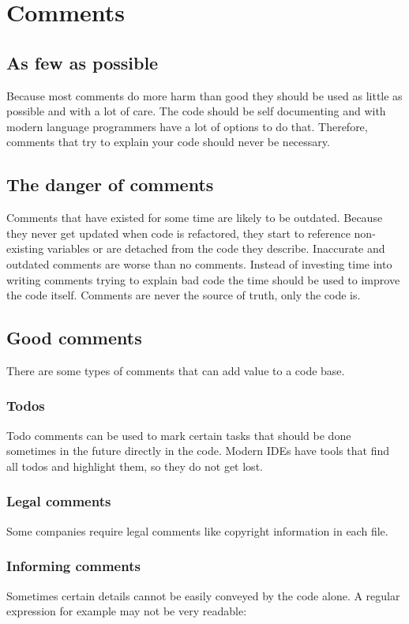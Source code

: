 \section{Comments}

\subsection{As few as possible}
Because most comments do more harm than good they should be used as little as possible and with a lot of care. The code should be self documenting and with modern language programmers have a lot of options to do that. Therefore, comments that try to explain your code should never be necessary.

\subsection{The danger of comments}
Comments that have existed for some time are likely to be outdated. Because they never get updated when code is refactored, they start to reference non-existing variables or are detached from the code they describe. Inaccurate and outdated comments are worse than no comments. Instead of investing time into writing comments trying to explain bad code the time should be used to improve the code itself. Comments are never the source of truth, only the code is.

\subsection{Good comments}
There are some types of comments that can add value to a code base.

\subsubsection{Todos}
Todo comments can be used to mark certain tasks that should be done sometimes in the future directly in the code. Modern IDEs have tools that find all todos and highlight them, so they do not get lost.

\subsubsection{Legal comments}
Some companies require legal comments like copyright information in each file.

\subsubsection{Informing comments}
Sometimes certain details cannot be easily conveyed by the code alone. A regular expression for example may not be very readable:

